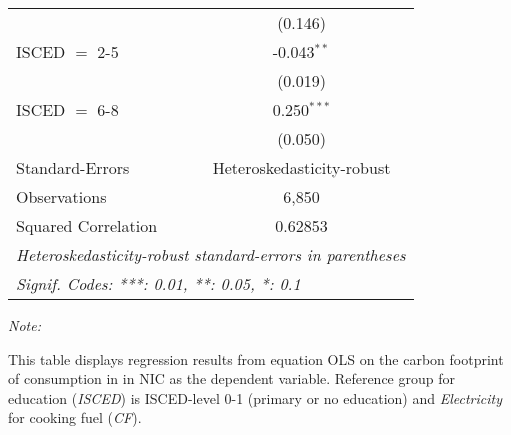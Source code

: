 \begin{table}[htbp!]
\begin{adjustbox}{width = 1\textwidth, max height = 0.95\textheight, center}
\begin{threeparttable}[b]
\begin{tabular}{lc}
                                & (0.146)\\   
            ISCED $=$ 2-5       & -0.043$^{**}$\\   
                                & (0.019)\\   
            ISCED $=$ 6-8       & 0.250$^{***}$\\   
                                & (0.050)\\   
            \midrule 
            Standard-Errors     & Heteroskedasticity-robust \\   
            Observations        & 6,850\\  
            Squared Correlation & 0.62853\\  
            \midrule \midrule
            \multicolumn{2}{l}{\emph{Heteroskedasticity-robust standard-errors in parentheses}}\\
            \multicolumn{2}{l}{\emph{Signif. Codes: ***: 0.01, **: 0.05, *: 0.1}}\\
         \end{tabular}
         
         \begin{tablenotes}\item \medskip \textit{Note:}
            \item This table displays regression results from equation OLS on the carbon footprint of consumption in  in NIC as the dependent variable.  Reference group for education (\textit{ISCED}) is ISCED-level 0-1 (primary or no education) and \textit{Electricity} for cooking fuel (\textit{CF}).
         \end{tablenotes}
      \end{threeparttable}
   \end{adjustbox}
\end{table}


